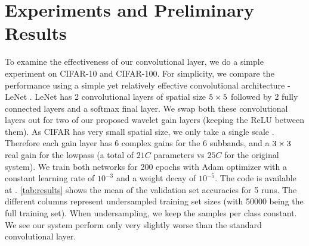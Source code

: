 \section{Experiments and Preliminary Results}\label{sec:results}
To examine the effectiveness of our convolutional layer, we do a simple experiment on CIFAR-10 and
CIFAR-100. For simplicity, we compare the performance using a simple yet relatively effective convolutional
architecture - LeNet \cite{lecun_gradient-based_1998}. LeNet has 2 convolutional layers of spatial
size $5\times 5$ followed by
2 fully connected layers and a softmax final layer. We swap both these convolutional
layers out for two of our proposed wavelet gain layers (keeping the ReLU between them). As CIFAR has
very small spatial size, we only take a single scale \DTCWT\@. Therefore each gain layer has $6$ complex gains
for the 6 subbands, and a $3\times 3$ real gain for the lowpass (a total of $21C$ parameters vs $25C$
for the original system). We train both networks for 200 epochs with Adam
\cite{kingma_adam:_2014} optimizer with a constant learning rate of $10^{-3}$ and a weight decay of
$10^{-5}$. The code is available at \cite{cotter_dtcwt_2018}. \autoref{tab:results} shows the
mean of the validation set accuracies for 5 runs. The different columns represent undersampled
training set sizes (with 50000 being the full training set). When undersampling, we keep the samples
per class constant. We see our system perform only very slightly worse than the standard
convolutional layer. 

